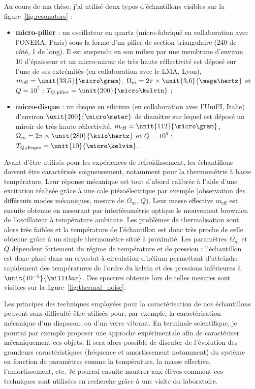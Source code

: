 \documentclass[12pt,a4paper]{article}
\newenvironment{mep}{%
\addcontentsline{ldf}{figure}{0}%
\begin{mep_env}
\small}
{\end{mep_env}}
\begin{document}
Au cours de ma thèse, j'ai utilisé deux types d'échantillons visibles sur la figure~\ref{fig:resonators} :
\begin{itemize}
\item \textbf{micro-pilier} : un oscillateur en quartz (micro-fabriqué en collaboration avec l'ONERA, Paris) sous la forme d'un pilier de section triangulaire (\unit{240}{\micro\meter} de côté, \unit{1}{\milli\meter} de long).
Il est suspendu en son milieu par une membrane d'environ \unit{10}{\micro\meter} d'épaisseur et un micro-miroir de très haute réflectivité est déposé sur l'une de ses extrémités (en collaboration avec le LMA, Lyon), $m_\mathrm{eff}=\unit{33{,}5}{\micro\gram}$, $\Omega_m=2\pi\times\unit{3{,}6}{\mega\hertz}$ et $Q=10^7$ : $T_{Q,\mathrm{pilier}} = \unit{200}{\micro\kelvin}$ ;
\item \textbf{micro-disque} : un disque en silicium (en collaboration avec l'UniFI, Italie) d'environ $\unit{200}{\micro\meter}$ de diamètre sur lequel est déposé un miroir de très haute réflectivité, $m_\mathrm{eff}=\unit{112}{\micro\gram}$, $\Omega_m=2\pi\times\unit{280}{\kilo\hertz}$ et $Q=10^6$ : $T_{Q,\mathrm{disque}} = \unit{10}{\micro\kelvin}$.
\end{itemize}
Avant d'être utilisés pour les expériences de refroidissement, les échantillons doivent être caractérisés soigneusement, notamment pour la thermométrie à basse température.
Leur réponse mécanique est tout d'abord calibrée à l'aide d'une excitation réalisée grâce à une cale piézoélectrique par exemple (observation des différents modes mécaniques, mesure de $\Omega_m$, $Q$).
Leur masse effective $m_\mathrm{eff}$ est ensuite obtenue en mesurant par interférométrie optique le mouvement brownien de l'oscillateur à température ambiante.
Les problèmes de thermalisation sont alors très faibles et la température de l'échantillon est donc très proche de celle obtenue grâce à un simple thermomètre situé à proximité.
Les paramètres $\Omega_m$ et $Q$ dépendent fortement du régime de température et de pression  : l'échantillon est donc placé dans un cryostat à circulation d'hélium permettant d'atteindre rapidement des températures de l'ordre du kelvin et des pressions inférieures à $\unit{10^{-5}}{\milli bar}$.
Des spectres obtenus lors de telles mesures sont visibles sur la figure~\ref{fig:thermal_noise}.

\begin{mep}
Les principes des techniques employées pour la caractérisation de nos échantillons peuvent sans difficulté être utilisés pour, par exemple, la caractérisation mécanique d'un diapason, ou d'un verre vibrant.
En terminale scientifique, je pourrai par exemple proposer une approche expérimentale afin de caractériser mécaniquement ces objets.
Il sera alors possible de discuter de l'évolution des grandeurs caractéristiques (fréquence et amortissement notamment) du système en fonction de paramètres comme la température, la masse effective, l'amortissement, etc.
Je pourrai ensuite montrer aux élèves comment ces techniques sont utilisées en recherche grâce à une visite du laboratoire.
\end{mep}
\end{document}

